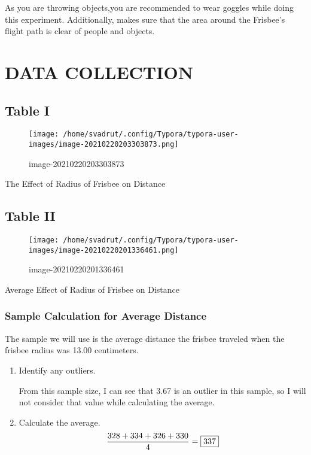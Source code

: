 \documentclass{article}
\begin{document}
As you are throwing objects,you are recommended to wear goggles while
doing this experiment. Additionally, makes sure that the area around the
Frisbee's flight path is clear of people and objects.

\section{DATA COLLECTION}\label{data-collection}

\subsection{Table I}\label{table-i}

\begin{figure}
\centering
\texttt{[image: /home/svadrut/.config/Typora/typora-user-images/image-20210220203303873.png]}
\caption{image-20210220203303873}
\end{figure}

The Effect of Radius of Frisbee on Distance

\subsection{Table II}\label{table-ii}

\begin{figure}
\centering
\texttt{[image: /home/svadrut/.config/Typora/typora-user-images/image-20210220201336461.png]}
\caption{image-20210220201336461}
\end{figure}

Average Effect of Radius of Frisbee on Distance

\subsubsection{Sample Calculation for Average
Distance}\label{sample-calculation-for-average-distance}

The sample we will use is the average distance the frisbee traveled when
the frisbee radius was 13.00 centimeters.

\begin{enumerate}
\def\labelenumi{\arabic{enumi}.}
\item
  Identify any outliers.

  From this sample size, I can see that 3.67 is an outlier in this
  sample, so I will not consider that value while calculating the
  average.
\item
  Calculate the average. \[
  \frac{328+334+326+330}{4} = \fbox{337}
  \]
\end{enumerate}
\end{document}
